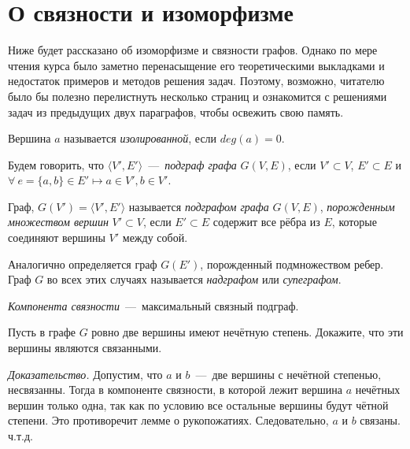 \section{О связности и изоморфизме}

	Ниже будет рассказано об изоморфизме и связности графов. Однако по мере чтения курса было заметно перенасыщение 
	его теоретическими выкладками и недостаток примеров и методов решения задач. Поэтому, возможно, читателю было бы полезно 
	перелистнуть несколько страниц и ознакомится с решениями задач из предыдущих двух параграфов, чтобы освежить свою память.


\begin{definition}
	Вершина $a$ называется \emph{изолированной}, если $deg(a) = 0$.
\end{definition}

\begin{definition}
	Будем говорить, что $\langle V', E' \rangle$~---~\emph{подграф графа} $G(V, E)$, если 
	$V' \subset V$, $E' \subset E$ и $\forall \!\ e = \lbrace a, b\rbrace \in E' \mapsto a \in V', b \in V'$.
	
	Граф, $G(V') = \langle V', E' \rangle$ называется \emph{подграфом графа} $G(V, E)$, \emph{порожденным множеством вершин} $V' \subset V$, 
	если $E' \subset E$ содержит все рёбра из $E$, которые соединяют вершины $V'$ между собой.
\end{definition}

	Аналогично определяется граф $G(E')$, порожденный подмножеством ребер. 
	Граф $G$ во всех этих случаях называется \emph{надграфом} или \emph{супеграфом}.
	
\begin{definition}
	\emph{Компонента связности}~---~максимальный связный подграф.
\end{definition}
		
\begin{statement}
	Пусть в графе $G$ ровно две вершины имеют нечётную степень. Докажите, что эти вершины являются связанными.
	
	\emph{Доказательство.} Допустим, что $a$ и $b$~---~две вершины с нечётной степенью, несвязанны. Тогда в компоненте связности, 
	в которой лежит вершина $a$ нечётных вершин только одна, так как по условию все остальные вершины будут чётной степени. 
	Это противоречит лемме о рукопожатиях. Следовательно, $a$ и $b$ связаны. ч.т.д.
\end{statement}

